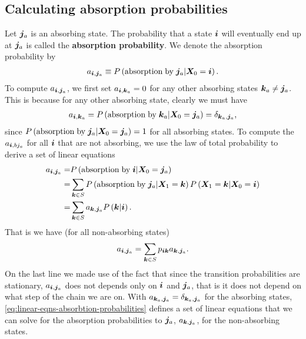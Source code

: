 \subsection{Calculating absorption probabilities}
Let ${\bm j}_a$ is an absorbing state. 
The probability that a state ${\bm i}$ will eventually end up at ${\bm j}_a$ is called the \textbf{absorption probability}.
We denote the absorption probability by
\begin{align}
    a_{{\bm i},{\bm j}_a}
    \equiv
    P\left(\mathrm{absorption\;by\;}{\bm j}_a|{\bm X}_0={\bm i}\right)
    .
\end{align}
To compute $a_{{\bm i}, {\bm j}_a}$, we first set $a_{{\bm i}, {\bm k}_a}=0$ for any other absorbing states ${\bm k}_a\neq{\bm j}_a$.
This is because for any other absorbing state, clearly we must have
\begin{align}
    a_{{\bm i},{\bm k}_a}
    = 
    P\left(\mathrm{absorption\;by\;}{\bm k}_a|{\bm X}_0={\bm j}_a\right)
    =
    \delta_{{\bm k}_a, {\bm j}_a}
    ,
\end{align}
since $P\left(\mathrm{absorption\;by\;}{\bm j}_a|{\bm X}_0={\bm j}_a\right)=1$ for all absorbing states.
To compute the $a_{{\bm i},bj_a}$ for all ${\bm i}$ that are not absorbing, we use the law of total probability to derive a set of linear equations
\begin{align}
    \label{eq:linear-eqns-absorbtion-probabilities-derivation}
    a_{{\bm i},{\bm j}_a}
    =&
    P\left(\mathrm{absorption\;by\;}{\bm i}|{\bm X}_0={\bm j}_a\right)
    \nonumber\\
    =&
    \sum_{{\bm k}\in S} P\left(\mathrm{absorption\;by\;}{\bm j}_a|{\bm X}_1={\bm k}\right)P\left({\bm X}_1={\bm k}|{\bm X}_0={\bm i}\right)
    \nonumber\\
    =&
    \sum_{{\bm k}\in S} a_{{\bm k},{\bm j}_a} P\left({\bm k}|{\bm i}\right)  
    .
\end{align}
That is we have (for all non-absorbing states)
\begin{align}
    \label{eq:linear-eqns-absorbtion-probabilities}
    a_{{\bm i},{\bm j}_a}
    =
    \sum_{{\bm k}\in S} p_{{\bm i}{\bm k}}a_{{\bm k},{\bm j}_a}   
    .
\end{align}
On the last line we made use of the fact that since the transition probabilities are stationary, $a_{{\bm i},{\bm j}_a}$ does not depends only on ${\bm i}$ and ${\bm j}_a$, that is it does not depend on what step of the chain we are on.
With $a_{{\bm k}_a,{\bm j}_a}=\delta_{{\bm k}_a,{\bm j}_a}$ for the absorbing states, \eqref{eq:linear-eqns-absorbtion-probabilities} defines a set of linear equations that we can solve for the absorption probabilities to ${\bm j}_a$, $a_{{\bm k},{\bm j}_a}$, for the non-absorbing states.

